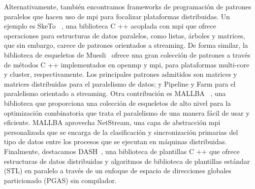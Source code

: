Alternativamente, también encontramos frameworks de programación de patrones paralelos que hacen uso de \acrshort{mpi} para focalizar plataformas distribuidas. Un ejemplo es SkeTo ~\cite{Matsuzaki:2006}, una biblioteca C ++ acoplada con \acrshort{mpi} que ofrece operaciones para estructuras de datos paralelos, como listas, árboles y matrices, que sin embargo, carece de patrones orientados a streaming. De forma similar, la biblioteca de esqueletos de Muesli~\cite{Ciechanowicz2009nster} ofrece una gran colección de patrones a través de métodos C ++ implementados en \acrshort{openmp} y \acrshort{mpi}, para plataformas multi-core y cluster, respectivamente. Los principales patrones admitidos son matrices y matrices distribuidas para el paralelismo de datos; y Pipeline y Farm para el paralelismo orientado a streaming. Otra contribución es MALLBA ~\cite{Alba2007}, una biblioteca que proporciona una colección de esqueletos de alto nivel para la optimización combinatoria que trata el paralelismo de una manera fácil de usar y eficiente. MALLBA aprovecha NetStream, una capa de abstracción \acrshort{mpi} personalizada que se encarga de la clasificación y sincronización primarias del tipo de datos entre los procesos que se ejecutan en máquinas distribuidas. Finalmente, destacamos DASH~\cite{dash2016}, una biblioteca de plantillas C ++ que ofrece estructuras de datos distribuidas y algoritmos de biblioteca de plantillas estándar (STL) en paralelo a través de un enfoque de espacio de direcciones globales particionado (PGAS) sin compilador.





